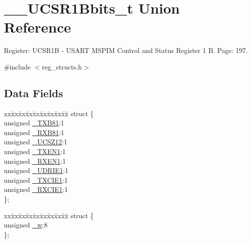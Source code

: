 \hypertarget{union_____u_c_s_r1_bbits__t}{\section{\+\_\+\+\_\+\+U\+C\+S\+R1\+Bbits\+\_\+t Union Reference}
\label{union_____u_c_s_r1_bbits__t}
}


Register\+: U\+C\+S\+R1\+B -\/ U\+S\+A\+R\+T M\+S\+P\+I\+M Control and Status Register 1 B. Page\+: 197.  




{\ttfamily \#include $<$reg\+\_\+structs.\+h$>$}

\subsection*{Data Fields}
\begin{DoxyCompactItemize}
\item 
\begin{tabbing}
xx\=xx\=xx\=xx\=xx\=xx\=xx\=xx\=xx\=\kill
struct \{\\
\>unsigned \hyperlink{union_____u_c_s_r1_bbits__t_a45f8c897ae8ffccc94c8eb3c8666e6ec}{\_TXB81}:1\\
\>unsigned \hyperlink{union_____u_c_s_r1_bbits__t_a528ee3920187cee1ed4258d9eee0ed59}{\_RXB81}:1\\
\>unsigned \hyperlink{union_____u_c_s_r1_bbits__t_a8d4204150d3c2332ee3bacf2a4675203}{\_UCSZ12}:1\\
\>unsigned \hyperlink{union_____u_c_s_r1_bbits__t_a75b771df2dc77eb637b2bafe1e28bb72}{\_TXEN1}:1\\
\>unsigned \hyperlink{union_____u_c_s_r1_bbits__t_a80dab72ba288983a6c28d5ae3c9c684c}{\_RXEN1}:1\\
\>unsigned \hyperlink{union_____u_c_s_r1_bbits__t_ac0c89c19a205c1b62466eed17f35ef6f}{\_UDRIE1}:1\\
\>unsigned \hyperlink{union_____u_c_s_r1_bbits__t_a1524ec6c9ea78733f3b63bb5edc0c556}{\_TXCIE1}:1\\
\>unsigned \hyperlink{union_____u_c_s_r1_bbits__t_a9dec2efc7e028b5afcb77672353b1937}{\_RXCIE1}:1\\
\}; \\

\end{tabbing}\item 
\begin{tabbing}
xx\=xx\=xx\=xx\=xx\=xx\=xx\=xx\=xx\=\kill
struct \{\\
\>unsigned \hyperlink{union_____u_c_s_r1_bbits__t_ad2247e39b7d674d98bd9ae5cdc82132e}{\_w}:8\\
\}; \\

\end{tabbing}\end{DoxyCompactItemize}


